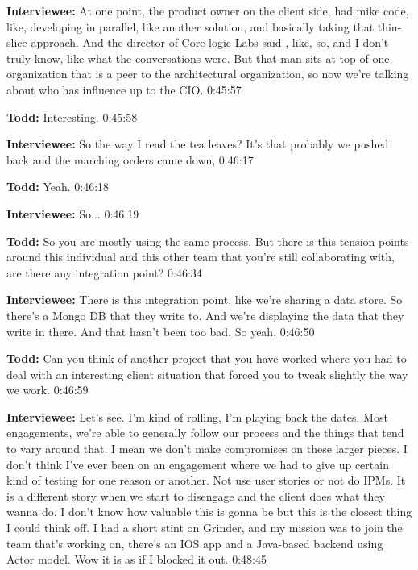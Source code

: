 \textbf{Interviewee:}  	At one point, the product owner on the client side, had mike code, like, developing in parallel, like another solution, and basically taking that thin-slice approach.  And the director of Core logic Labs said , like, so, and I don't truly know, like what the conversations were. But that man sits at top of one organization that is a peer to the architectural organization, so now we're talking about who has influence up to the CIO.  0:45:57

\textbf{Todd:}	Interesting.  0:45:58

\textbf{Interviewee:}  	So the way I read the tea leaves?  It's that probably we pushed back and the marching orders came down,   0:46:17

\textbf{Todd:}  	Yeah.  0:46:18

\textbf{Interviewee:}  	So...  0:46:19

\textbf{Todd:}  	So you are mostly using the same process.  But there is this tension points around this individual and this other team that you're still collaborating with, are there any integration point?  0:46:34

\textbf{Interviewee:}  	There is this integration point, like we're sharing a data store.   So there's a Mongo DB that they write to. And we're displaying the data that they write in there.  And that hasn't been too bad.  So yeah.  0:46:50

\textbf{Todd:}  	Can you think of another project that you have worked where you had to deal with an interesting client situation that forced you to tweak slightly the way we work.  0:46:59

\textbf{Interviewee:}  	Let's see.  I'm kind of rolling, I'm playing back the dates.  Most engagements, we're able to generally follow our process and the things that tend to vary around that.  I mean we don't make compromises on these larger pieces.   I don't think I've ever been on an engagement where we had to give up certain kind of testing for one reason or another.  Not use user stories or not do IPMs. It is a different story when we start to disengage and the client does what they wanna do.  I don't know how valuable this is gonna be but this is the closest thing I could think off.  I had a short stint on Grinder, and my mission was to join the team that's working on, there's an IOS app and a Java-based backend using Actor model.  Wow it is as if I blocked it out.   0:48:45

